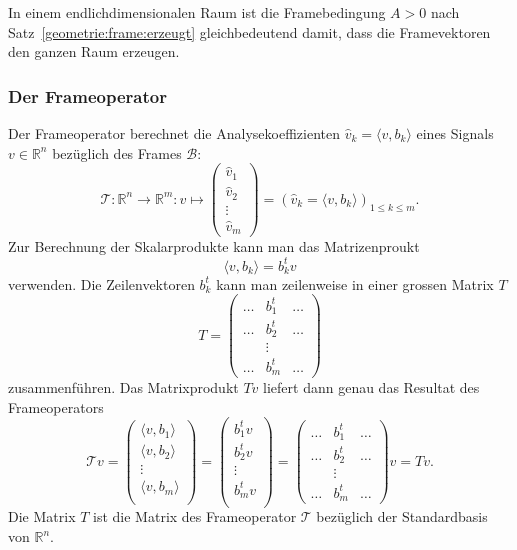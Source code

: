 In einem endlichdimensionalen Raum ist die Framebedingung $A>0$ 
nach Satz~\ref{geometrie:frame:erzeugt}
gleichbedeutend damit, dass die Framevektoren den ganzen Raum erzeugen.

\subsubsection{Der Frameoperator}
Der Frameoperator berechnet die Analysekoeffizienten
$\hat{v}_k=\langle v,b_k\rangle$ eines Signals
$v\in \mathbb R^n$ bezüglich des Frames $\mathcal{B}$:
\[
\mathcal{T}\colon \mathbb R^n \to \mathbb R^m
:
v \mapsto
\begin{pmatrix}
\hat{v}_1\\\hat{v}_2\\\vdots\\\hat{v}_m
\end{pmatrix}
=
(\hat{v}_k=\langle v,b_k\rangle)_{1\le k\le m}.
\]
Zur Berechnung der Skalarprodukte kann man das Matrizenproukt
\[
\langle v,b_k\rangle
=
b_k^t v
\]
verwenden.
Die Zeilenvektoren $b_k^t$ kann man zeilenweise in einer grossen Matrix $T$
\[
T 
=
\begin{pmatrix}
\dots&b_1^t &\dots\\
\dots&b_2^t &\dots\\
     &\vdots&     \\
\dots&b_m^t &\dots
\end{pmatrix}
\]
zusammenführen.
Das Matrixprodukt $Tv$ liefert dann genau das Resultat des Frameoperators
\[
\mathcal{T} v
=
\begin{pmatrix}
\langle v, b_1\rangle\\
\langle v, b_2\rangle\\
\vdots\\
\langle v, b_m\rangle\\
\end{pmatrix}
=
\begin{pmatrix}
b_1^tv\\
b_2^tv\\
\vdots\\
b_m^tv\\
\end{pmatrix}
=
\begin{pmatrix}
\dots&b_1^t &\dots\\
\dots&b_2^t &\dots\\
     &\vdots&     \\
\dots&b_m^t &\dots
\end{pmatrix}
v
=
Tv.
\]
Die Matrix $T$ ist die Matrix des Frameoperator $\mathcal T$ bezüglich der
Standardbasis von $\mathbb R^n$.

